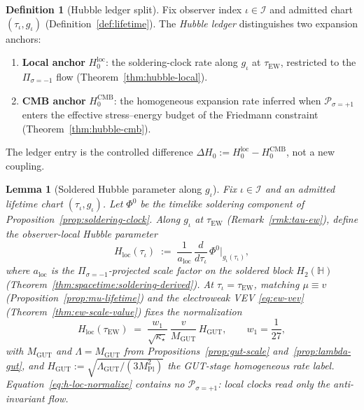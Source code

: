 \documentclass[aps,prd,onecolumn,amsmath,amssymb,nofootinbib,11pt]{revtex4-2}
\numberwithin{equation}{section}
\theoremstyle{plain}
\newtheorem{lemma}[theorem]{Lemma}
\theoremstyle{definition}
\newtheorem{definition}[theorem]{Definition}
\theoremstyle{remark}
\newcommand{\Quat}{\mathbb{H}}
\newcommand{\orderparam}{\Phi}
\newcommand{\MPl}{M_{\mathrm{Pl}}}
\begin{document}
\begin{definition}[Hubble ledger split]
\label{def:hubble-ledger}
Fix observer index $\iota\in\mathcal{I}$ and admitted chart
$(\tau_\iota,g_\iota)$ (Definition~\ref{def:lifetime}). The \emph{Hubble
ledger} distinguishes two expansion anchors:
\begin{enumerate}[label=(\roman*),leftmargin=*]
  \item \textbf{Local anchor} $H_0^{\mathrm{loc}}$: the soldering-clock rate
    along $g_\iota$ at $\tau_{\mathrm{EW}}$, restricted to the
    $\Pi_{\sigma=-1}$ flow (Theorem~\ref{thm:hubble-local}).
  \item \textbf{CMB anchor} $H_0^{\mathrm{CMB}}$: the homogeneous expansion
    rate inferred when $\mathcal{P}_{\sigma=+1}$ enters the effective
    stress--energy budget of the Friedmann constraint
    (Theorem~\ref{thm:hubble-cmb}).
\end{enumerate}
The ledger entry is the controlled difference
$\Delta H_0:=H_0^{\mathrm{loc}}-H_0^{\mathrm{CMB}}$, not a new coupling.
\end{definition}

\begin{lemma}[Soldered Hubble parameter along $g_\iota$]
\label{lem:soldered-hubble}
Fix $\iota\in\mathcal{I}$ and an admitted lifetime chart
$(\tau_\iota,g_\iota)$. Let $\orderparam^0$ be the timelike soldering component
of Proposition~\ref{prop:soldering-clock}. Along $g_\iota$ at
$\tau_{\mathrm{EW}}$ (Remark~\ref{rmk:tau-ew}), define the
\emph{observer-local Hubble parameter}
\begin{equation}\label{eq:h-soldered}
  H_{\mathrm{loc}}(\tau_\iota)
  \;:=\;
  \frac{1}{a_{\mathrm{loc}}}\,
  \frac{d}{d\tau_\iota}\,
  \orderparam^0\big|_{g_\iota(\tau_\iota)},
\end{equation}
where $a_{\mathrm{loc}}$ is the $\Pi_{\sigma=-1}$-projected scale factor on
the soldered block $H_2(\Quat)$ (Theorem~\ref{thm:spacetime:soldering-derived}).
At $\tau_\iota=\tau_{\mathrm{EW}}$, matching $\mu\equiv v$
(Proposition~\ref{prop:mu-lifetime}) and the electroweak VEV
\eqref{eq:ew-vev} (Theorem~\ref{thm:ew-scale-value}) fixes the normalization
\begin{equation}\label{eq:h-loc-normalize}
  H_{\mathrm{loc}}(\tau_{\mathrm{EW}})
  \;=\;
  \frac{w_1}{\sqrt{\kappa_\star}}\,
  \frac{v}{M_{\mathrm{GUT}}}\,
  H_{\mathrm{GUT}},
  \qquad
  w_1=\frac{1}{27},
\end{equation}
with $M_{\mathrm{GUT}}$ and $\Lambda=M_{\mathrm{GUT}}$ from
Propositions~\ref{prop:gut-scale} and~\ref{prop:lambda-gut}, and
$H_{\mathrm{GUT}}:=\sqrt{\Lambda_{\mathrm{GUT}}/(3\MPl^2)}$ the GUT-stage
homogeneous rate label. Equation~\eqref{eq:h-loc-normalize} contains no
$\mathcal{P}_{\sigma=+1}$: local clocks read only the anti-invariant flow.
\end{lemma}
\end{document}
